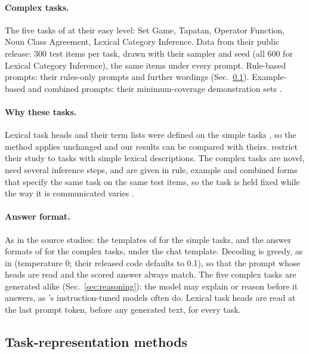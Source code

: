 \documentclass[11pt,a4paper]{article}
\begin{document}
\paragraph{Complex tasks.} The five tasks of \citet{fu2026rules} at their easy level: Set Game, Tapatan, Operator Function, Noun Class Agreement, Lexical Category Inference. Data from their public release: 300 test items per task, drawn with their sampler and seed (all 600 for Lexical Category Inference), the same items under every prompt.
Rule-based prompts: their rules-only prompts \citep[App.~F]{fu2026rules} and further wordings (Sec.~\ref{sec:trmethods}).
Example-based and combined prompts: their minimum-coverage demonstration sets \citep[Sec.~2.5]{fu2026rules}.

\paragraph{Why these tasks.} Lexical task heads and their term lists were defined on the simple tasks \citep{yang2026shared}, so the method applies unchanged and our results can be compared with theirs. \citet[Sec.~4]{yang2026shared} restrict their study to tasks with simple lexical descriptions. The complex tasks are novel, need several inference steps, and are given in rule, example and combined forms that specify the same task on the same test items, so the task is held fixed while the way it is communicated varies \citep[Sec.~1--2]{fu2026rules}.

\paragraph{Answer format.} As in the source studies: the templates of \citet{yang2026shared} for the simple tasks, and the answer formats of \citet[App.~F]{fu2026rules} for the complex tasks, under the chat template. Decoding is greedy, as in \citet[App.~A]{fu2026rules} (temperature 0; their released code defaults to 0.1), so that the prompt whose heads are read and the scored answer always match. The five complex tasks are generated alike (Sec.~\ref{sec:reasoning}): the model may explain or reason before it answers, as \citeauthor{fu2026rules}'s instruction-tuned models often do. Lexical task heads are read at the last prompt token, before any generated text, for every task.

\subsection{Task-representation methods}\label{sec:trmethods}
\end{document}
